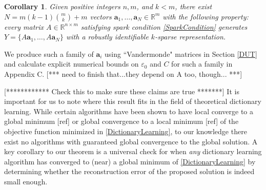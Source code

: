 \documentclass[journal, onecolumn]{IEEEtran}
\newtheorem{corollary}{Corollary}
\begin{document}
\begin{corollary}\label{DeterministicUniquenessCorollary}
Given positive integers $n, m$, and $k < m$, there exist $N =  m(k-1){m \choose k}+m$ vectors $\mathbf{a}_1, \ldots, \mathbf{a}_N \in \mathbb{R}^m$ with the following property: every matrix $A \in \mathbb{R}^{n \times m}$ satisfying spark condition \eqref{SparkCondition} generates $Y = \{A\mathbf{a}_1, \ldots, A\mathbf{a}_N\}$ with a robustly identifiable $k$-sparse representation.
\end{corollary}

We produce such a family of $\mathbf{a}_i$ using ``Vandermonde" matrices in Section \ref{DUT} and calculate explicit numerical bounds on $\varepsilon_0$ and $C$ for such a family in Appendix C. [*** need to finish that...they depend on A too, though... ***] 

[************ Check this to make sure these claims are true *******]
It is important for us to note where this result fits in the field of theoretical dictionary learning. While certain algorithms have been shown to have local converge to a global minimum [ref] or global convergence to a local minimum [ref] of the objective function minimized in \eqref{DictionaryLearning}, to our knowledge there exist no algorithms with guaranteed global convergence to the global solution. A key corollary to our theorem is a universal check for when \emph{any} dictionary learning algorithm has converged to (near) a global minimum of \eqref{DictionaryLearning} by determining whether the reconstruction error of the proposed solution is indeed small enough. 
\end{document}
